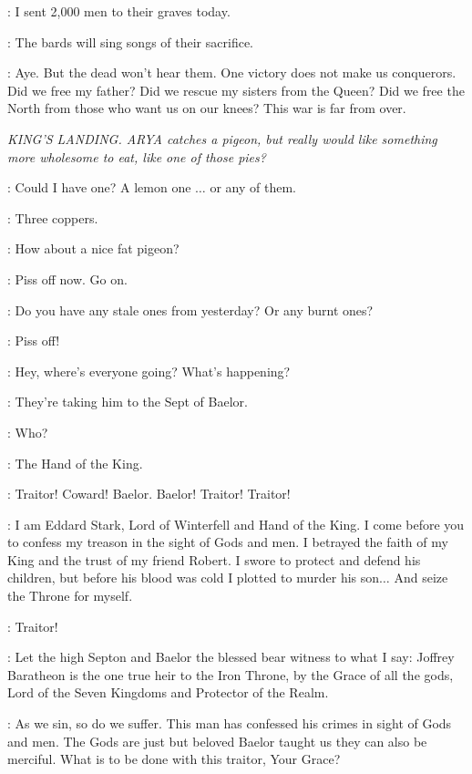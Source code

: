 \ROBB: I sent 2,000 men to their graves today. 

\THEON: The bards will sing songs of their sacrifice. 

\ROBB: Aye. But the dead won't hear them. One victory does not make us conquerors. Did we free my father? Did we rescue my sisters from the Queen? Did we free the North from those who want us on our knees? This war is far from over. 


\scene

\textit{KING'S LANDING.  ARYA catches a pigeon, but really would like something more wholesome to eat, like one of those pies?} 

\ARYA: Could I have one? A lemon one $\ldots$ or any of them. 

\PIESELLER: Three coppers. 

\ARYA: How about a nice fat pigeon? 

\PIESELLER: Piss off now. Go on. 

\ARYA: Do you have any stale ones from yesterday? Or any burnt ones? 

\PIESELLER: Piss off! 

\ARYA: Hey, where's everyone going? What's happening? 

\URCHIN: They're taking him to the Sept of Baelor. 

\ARYA: Who? 

\URCHIN: The Hand of the King. 


\CROWD: Traitor! Coward! Baelor. Baelor! Traitor! Traitor! 

\NED: I am Eddard Stark, Lord of Winterfell and Hand of the King. I come before you to confess my treason in the sight of Gods and men. I betrayed the faith of my King and the trust of my friend Robert. I swore to protect and defend his children, but before his blood was cold I plotted to murder his son$\ldots$ And seize the Throne for myself. 

\CROWD: Traitor! 

\NED: Let the high Septon and Baelor the blessed bear witness to what I say: Joffrey Baratheon is the one true heir to the Iron Throne, by the Grace of all the gods, Lord of the Seven Kingdoms and Protector of the Realm. 

\PYCELLE: As we sin, so do we suffer. This man has confessed his crimes in sight of Gods and men. The Gods are just but beloved Baelor taught us they can also be merciful.  What is to be done with this traitor, Your Grace? 

